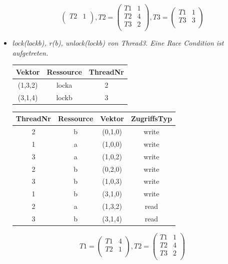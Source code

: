 \documentclass[10pt,a4paper]{article}
\begin{document}
\begin{itemize}
\[\begin{pmatrix}
		T2 & 1\\
	\end{pmatrix}
	, T2 = \begin{pmatrix}
		T1 & 1\\		
		T2 & 4\\
		T3 & 2\\
	\end{pmatrix}
	, T3 = \begin{pmatrix}
		T1 & 1\\		
		T3 & 3\\
	\end{pmatrix}
\]
\item \textit{lock(lockb), r(b), unlock(lockb) von Thread3. Eine Race Condition ist aufgetreten.}\\[0.2cm]
\begin{tabular}{ >{\small}c >{\small}c >{\small}c }
  	Vektor & Ressource & ThreadNr \\\hline
  	(1,3,2) & locka & 2 \\
  	(3,1,4) & lockb & 3 \\\hline
\end{tabular}\hspace*{0.5cm}
\begin{tabular}{ >{\small}c >{\small}c >{\small}c >{\small}c }
  	ThreadNr & Ressource & Vektor & ZugriffsTyp \\\hline
  	2 & b & (0,1,0) & write \\
  	1 & a & (1,0,0) & write \\
  	3 & a & (1,0,2) & write \\
  	\color{red}2 & \color{red}b & \color{red}(0,2,0) & \color{red}write\\
  	3 & b & (1,0,3) & write \\
  	1 & b & (3,1,0) & write \\
  	2 & a & (1,3,2) & read \\
  	\color{red}3 & \color{red}b & \color{red}(3,1,4) & \color{red}read \\\hline
\end{tabular}
\[
	T1 = \begin{pmatrix}
		T1 & 4\\
		T2 & 1\\
	\end{pmatrix}
	, T2 = \begin{pmatrix}
		T1 & 1\\		
		T2 & 4\\
		T3 & 2\\
	\end{pmatrix}
\]
\end{itemize}
\end{document}
